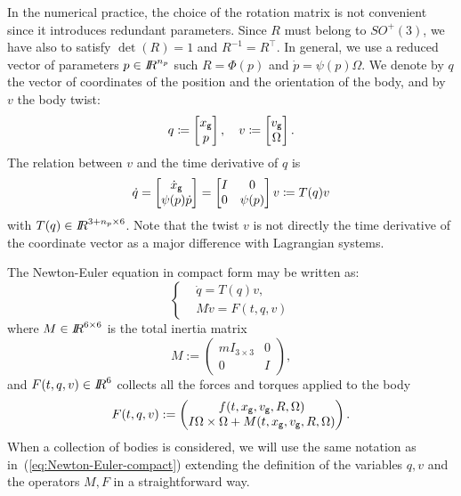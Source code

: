 In the numerical practice, the choice of the rotation matrix is not convenient since it introduces redundant parameters. Since $R$ must belong to $SO^+(3)$, we have also to satisfy $\det(R)=1$ and $R^{-1}=R^\top$. In general, we use a reduced vector of parameters $p\in\mbox{\rm $I\!\!R$}^{n_p}$ such $R = \Phi(p)$ and $\dot p = \psi(p)\Omega $. We denote  by $q$ the vector of coordinates of the position and the orientation of the body, and by $v$ {the body twist}:
\begin{equation}
  q \coloneqq \begin{bmatrix}
    x_{\sf \small g}\\
    p
  \end{bmatrix},\quad 
  v \coloneqq \begin{bmatrix}
     v_{\sf \small g}\\
     \Omega
   \end{bmatrix}.
 \end{equation}
 The relation between $v$ and the time derivative of $q$ is
\begin{equation}
  \label{eq:TT}
  \dot q = 
  \begin{bmatrix}
     \dot x_{\sf \small g}\\
     \psi(p) \dot p
   \end{bmatrix}
   = 
   \begin{bmatrix}
     I & 0 \\
     0 & \psi(p)
   \end{bmatrix}
   v
   \coloneqq
   T(q) v
\end{equation}
with $T(q) \in \mbox{\rm $I\!\!R$}^{{3+n_p}\times 6}$.
{Note that the twist $v$ is not directly the time derivative of the coordinate vector as a major difference with Lagrangian systems. }

%
The Newton-Euler equation in compact form may be written as:
\begin{equation}
\label{eq:Newton-Euler-compact}
\boxed{ \left \{ 
 \begin{aligned}
  &\dot q=T(q)v, \\
  & M \dot v = F(t, q, v)
 \end{aligned}
 \right.}
\end{equation}
where $M\in\mbox{\rm $I\!\!R$}^{6\times6}$ is the total inertia matrix
\begin{equation}
  M:= \begin{pmatrix}
    m I_{3\times 3} & 0 \\
    0 & I 
  \end{pmatrix},
\end{equation}
and $F(t, q, v)\in \mbox{\rm $I\!\!R$}^6$ collects all the forces and torques applied to the body
\begin{equation}
  F(t,q,v):= \begin{pmatrix}
    f(t,x_{\sf \small g},  v_{\sf \small g}, R, \Omega ) \\
    I \Omega \times \Omega + M(t,x_{\sf \small g}, v_{\sf \small g}, R, \Omega )
  \end{pmatrix}.
\end{equation}
When a collection of bodies is considered, we will use the same notation as in~(\ref{eq:Newton-Euler-compact}) extending the definition of the variables $q,v$ and the operators $M,F$ in a straightforward way.




